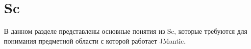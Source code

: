 \section{Sc}
В данном разделе представлены основные понятия из Sc, которые требуются для понимания предметной области с которой работает JMantic. 